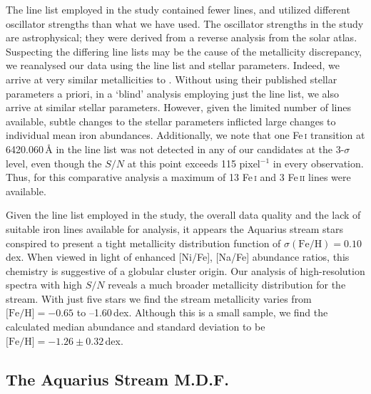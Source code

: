 \documentclass{emulateapj}
\begin{document}
The line list employed in the \citet{wylie-de-boer;et-al_2012} study contained fewer lines, and utilized different oscillator strengths than what we have used. The oscillator strengths in the \citet{wylie-de-boer;et-al_2012} study are astrophysical; they were derived from a reverse analysis from the \citet{hinkle;et-al_2003} solar atlas. Suspecting the differing line lists may be the cause of the metallicity discrepancy, we reanalysed our data using the \citet{wylie-de-boer;et-al_2012} line list and stellar parameters. Indeed, we arrive at very similar metallicities to \citet{wylie-de-boer;et-al_2012}. Without using their published stellar parameters a priori, in a `blind' analysis employing just the \citet{wylie-de-boer;et-al_2012} line list, we also arrive at similar stellar parameters. However, given the limited number of lines available, subtle changes to the stellar parameters inflicted large changes to individual mean iron abundances.  Additionally, we note that one Fe\,\textsc{i} transition at 6420.060\,\AA{} in the \citet{wylie-de-boer;et-al_2012} line list was not detected in any of our candidates at the 3-$\sigma$ level, even though the $S/N$ at this point exceeds 115 pixel$^{-1}$ in every observation. Thus, for this comparative analysis a maximum of 13 Fe\,\textsc{i} and 3 Fe\,\textsc{ii} lines were available.

Given the line list employed in the \citet{wylie-de-boer;et-al_2012} study, the overall data quality and the lack of suitable iron lines available for analysis, it appears the Aquarius stream stars conspired to present a tight metallicity distribution function of $\sigma(\mbox{Fe/H}) = 0.10$\,dex. When viewed in light of enhanced [Ni/Fe], [Na/Fe] abundance ratios, this chemistry is suggestive of a globular cluster origin. Our analysis of high-resolution spectra with high $S/N$ reveals a much broader metallicity distribution for the stream. With just five stars we find the stream metallicity varies from $\mbox{[Fe/H]} = -0.65$ to --1.60\,dex. Although this is a small sample, we find the calculated median abundance and standard deviation to be $\mbox{[Fe/H]} = -1.26 \pm 0.32$\,dex.


\subsection{The Aquarius Stream M.D.F.}
\end{document}
